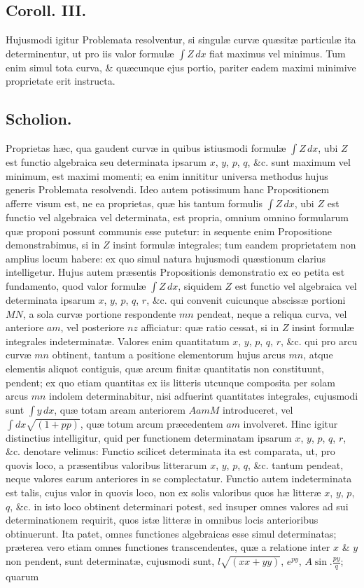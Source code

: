 \subsection*{Coroll. III.}
Hujusmodi igitur Problemata resolventur, si singulæ curvæ quæsitæ particulæ ita determinentur, ut pro iis valor formulæ $\int Z\,dx$ fiat maximus vel minimus. Tum enim simul tota curva, \& quæcunque ejus portio, pariter eadem maximi minimive proprietate erit instructa.

\subsection*{Scholion.}
Proprietas hæc, qua gaudent curvæ in quibus istiusmodi formulæ $\int Z\,dx$, ubi $Z$ est functio algebraica seu determinata ipsarum $x$, $y$, $p$, $q$, \&c. sunt maximum vel minimum, est maximi momenti; ea enim innititur universa methodus hujus generis Problemata resolvendi. Ideo autem potissimum hanc Propositionem afferre visum est, ne ea proprietas, quæ his tantum formulis $\int Z\,dx$, ubi $Z$ est functio vel algebraica vel determinata, est propria, omnium omnino formularum quæ proponi possunt communis esse putetur: in sequente enim Propositione demonstrabimus, si in $Z$ insint formulæ integrales; tum eandem proprietatem non amplius locum habere: ex quo simul natura hujusmodi quæstionum clarius intelligetur. Hujus autem præsentis Propositionis demonstratio ex eo petita est fundamento, quod valor formulæ $\int Z\,dx$, siquidem $Z$ est functio vel algebraica vel determinata ipsarum $x$, $y$, $p$, $q$, $r$, \&c. qui convenit cuicunque abscissæ portioni $MN$, a sola curvæ portione respondente $mn$ pendeat, neque a reliqua curva, vel anteriore $am$, vel posteriore $nz$ afficiatur: quæ ratio cessat, si in $Z$ insint formulæ integrales indeterminatæ. Valores enim quantitatum $x$, $y$, $p$, $q$, $r$, \&c. qui pro arcu curvæ $mn$ obtinent, tantum a positione elementorum hujus arcus $mn$, atque elementis aliquot contiguis, quæ arcum finitæ quantitatis non constituunt, pendent; ex quo etiam quantitas ex iis litteris utcunque composita per solam arcus $mn$ indolem determinabitur, nisi adfuerint quantitates integrales, cujusmodi sunt $\int y\,dx$, quæ totam aream anteriorem $AamM$ introduceret, vel $\int dx\sqrt{(1+pp)}$, quæ totum arcum præcedentem $am$ involveret. Hinc igitur distinctius intelligitur, quid per functionem determinatam ipsarum $x$, $y$, $p$, $q$, $r$, \&c. denotare velimus: Functio scilicet determinata ita est comparata, ut, pro quovis loco, a præsentibus valoribus litterarum $x$, $y$, $p$, $q$, \&c. tantum pendeat, neque valores earum anteriores in se complectatur. Functio autem indeterminata est talis, cujus valor in quovis loco, non ex solis valoribus quos hæ litteræ $x$, $y$, $p$, $q$, \&c. in isto loco obtinent determinari potest, sed insuper omnes valores ad sui determinationem requirit, quos istæ litteræ in omnibus locis anterioribus obtinuerunt. Ita patet, omnes functiones algebraicas esse simul determinatas; præterea vero etiam omnes functiones transcendentes, quæ a relatione inter $x$ \& $y$ non pendent, sunt determinatæ, cujusmodi sunt, $l\sqrt{(xx+yy)}$, $e^{p y}$, $A\sin.\frac{p y}{q}$; quarum 